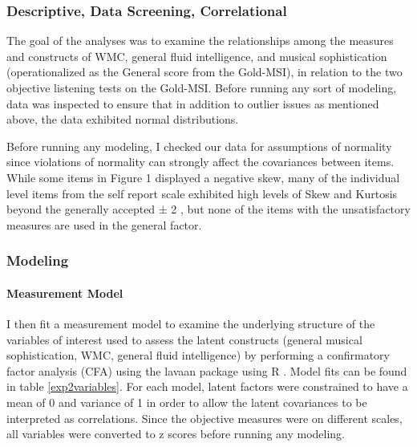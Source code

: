 \documentclass[12pt,]{book}
\let\oldparagraph\paragraph
\renewcommand{\paragraph}[1]{\oldparagraph{#1}\mbox{}}
\begin{document}
\hypertarget{descriptive-data-screening-correlational}{%
\subsubsection{Descriptive, Data Screening, Correlational}\label{descriptive-data-screening-correlational}}

The goal of the analyses was to examine the relationships among the measures and constructs of WMC, general fluid intelligence, and musical sophistication (operationalized as the General score from the Gold-MSI), in relation to the two objective listening tests on the Gold-MSI.
Before running any sort of modeling, data was inspected to ensure that in addition to outlier issues as mentioned above, the data exhibited normal distributions.

Before running any modeling, I checked our data for assumptions of normality since violations of normality can strongly affect the covariances between items.
While some items in Figure 1 displayed a negative skew, many of the individual level items from the self report scale exhibited high
levels of Skew and Kurtosis beyond the generally accepted ± 2 \citep{fieldDiscoveringStatisticsUsing2012}, but none of the items with the unsatisfactory measures are used in the general factor.

\hypertarget{modeling}{%
\subsubsection{Modeling}\label{modeling}}

\hypertarget{measurement-model}{%
\paragraph{Measurement Model}\label{measurement-model}}

I then fit a measurement model to examine the underlying structure of the variables of interest used to assess the latent constructs (general musical sophistication, WMC, general fluid intelligence) by performing a confirmatory factor analysis (CFA) using the lavaan package \citep{rosseelLavaanPackageStructural2012} using R \citep{teamLanguageEnvironmentStatistical2015}.
Model fits can be found in table \ref{exp2variables}.
For each model, latent factors were constrained to have a mean of 0 and variance of 1 in order to allow the latent covariances to be interpreted as correlations.
Since the objective measures were on different scales, all variables were converted to z scores before running any modeling.
\end{document}
